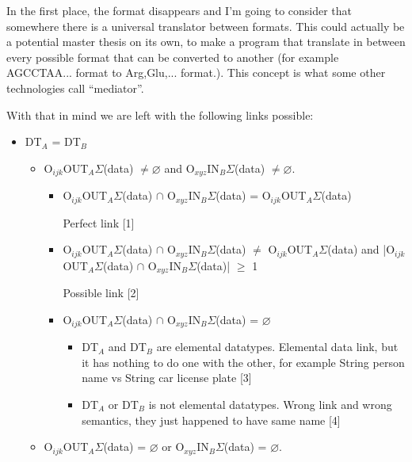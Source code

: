 \documentclass[a4paper,10pt]{article}
\begin{document}
  In the first place, the format disappears and I'm going to consider that somewhere there is a universal translator between formats. This could actually be a potential master thesis on its own, to make a program that translate in between every possible format that can be converted to another (for example AGCCTAA... format to Arg,Glu,... format.). This concept is what some other technologies call “mediator”.\vspace{3 mm}

  With that in mind we are left with the following links possible:

  \begin{itemize}
  \item DT$_{A}$  = DT$_{B}$
    \begin{itemize}
    \item O$_{ijk}$OUT$_{A}\Sigma$(data) $\neq \varnothing$ and O$_{xyz}$IN$_{B}\Sigma$(data) $\neq \varnothing$.
      \begin{itemize}
      \item O$_{ijk}$OUT$_{A}\Sigma$(data) $\cap$ O$_{xyz}$IN$_{B}\Sigma$(data) = O$_{ijk}$OUT$_{A}\Sigma$(data)
	
	Perfect link [1]

      \item O$_{ijk}$OUT$_{A}\Sigma$(data) $\cap$ O$_{xyz}$IN$_{B}\Sigma$(data) $\neq$ O$_{ijk}$OUT$_{A}\Sigma$(data) and |O$_{ijk}$OUT$_{A}\Sigma$(data) $\cap$ O$_{xyz}$IN$_{B}\Sigma$(data)| $\geq$ 1 

	Possible link [2]

      \item O$_{ijk}$OUT$_{A}\Sigma$(data) $\cap$ O$_{xyz}$IN$_{B}\Sigma$(data) = $\varnothing$
	\begin{itemize}
	  \item DT$_{A}$ and DT$_{B}$ are elemental datatypes.
	    Elemental data link, but it has nothing to do one with the other, for example String person name vs String car license plate [3] 

	  \item DT$_{A}$ or DT$_{B}$ is not elemental datatypes.
	    Wrong link and wrong semantics, they just happened to have same name [4]

	\end{itemize}
      \end{itemize}

    \item O$_{ijk}$OUT$_{A}\Sigma$(data) = $\varnothing$ or O$_{xyz}$IN$_{B}\Sigma$(data) = $\varnothing$.


\end{itemize}
\end{itemize}
\end{document}
